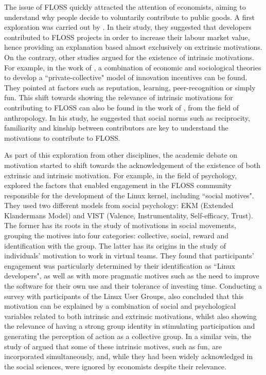 The issue of FLOSS quickly attracted the attention of economists, aiming to understand why people decide to voluntarily contribute to public goods. A first exploration was carried out by \textcite{Lerner2002}. In their study, they suggested that developers contributed to FLOSS projects in order to increase their labour market value, hence providing an explanation based almost exclusively on extrinsic motivations. On the contrary, other studies argued for the existence of intrinsic motivations. For example, in the work of \textcite{Hippel2003}, a combination of economic and sociological theories to develop a ``private-collective" model of innovation incentives can be found. They pointed at factors such as reputation, learning, peer-recognition or simply fun. This shift towards showing the relevance of intrinsic motivations for contributing to FLOSS can also be found in the work of \textcite{zeitlyn2003gift}, from the field of anthropology. In his study, he suggested that social norms such as reciprocity, familiarity and kinship between contributors are key to understand the motivations to contribute to FLOSS.

As part of this exploration from other disciplines, the academic debate on motivation started to shift towards the acknowledgement of the existence of both extrinsic and intrinsic motivation. For example, in the field of psychology,  \textcite{Hertel2003} explored the factors that enabled engagement in the FLOSS community responsible for the development of the Linux kernel, including ``social motives". They used two different models from social psychology: EKM (Extended Klandermans Model) and VIST (Valence, Instrumentality, Self-efficacy, Trust). The former has its roots in the study of motivations in social movements, grouping the motives into four categories: collective, social, reward and identification with the group. The latter has its origins in the study of individuals' motivation to work in virtual teams. They found that participants' engagement was particularly determined by their identification as ``Linux developers", as well as with more pragmatic motives such as the need to improve the software for their own use and their tolerance of investing time. Conducting a survey with participants of the Linux User Groups, \textcite{Bagozzi2006} also concluded that this motivation can be explained by a combination of social and psychological variables related to both intrinsic and extrinsic motivations, whilst also showing the relevance of having a strong group identity in stimulating participation and generating the perception of action as a collective group. In a similar vein, the study of \textcite{bitzer2007intrinsic} argued that some of these intrinsic motives, such as fun, are incorporated simultaneously, and, while they had been widely acknowledged in the social sciences, were ignored by economists despite their relevance. 

